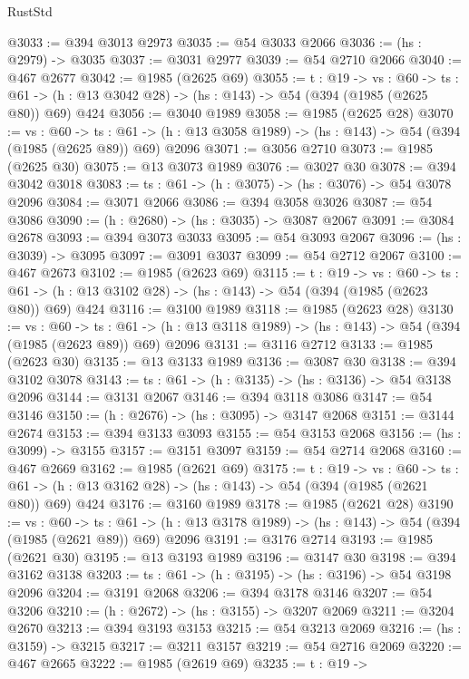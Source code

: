 \begin{lexlean}{RustStd}
\begin{coremodule}
{\begin{coremodule}
{{{{{{{{@3033 := @394 @3013 @2973
@3035 := @54 @3033 @2066
@3036 := (hs : @2979) -> @3035
@3037 := @3031 @2977
@3039 := @54 @2710 @2066
@3040 := @467 @2677
@3042 := @1985 (@2625 @69)
@3055 := {t : @19} ->
  {vs : @60} ->
  {ts : @61} -> (h : @13 @3042 @28) -> (hs : @143) -> @54 (@394 (@1985 (@2625 @80)) @69) @424
@3056 := @3040 @1989
@3058 := @1985 (@2625 @28)
@3070 := {vs : @60} ->
  {ts : @61} -> (h : @13 @3058 @1989) -> (hs : @143) -> @54 (@394 (@1985 (@2625 @89)) @69) @2096
@3071 := @3056 @2710
@3073 := @1985 (@2625 @30)
@3075 := @13 @3073 @1989
@3076 := @3027 @30
@3078 := @394 @3042 @3018
@3083 := {ts : @61} -> (h : @3075) -> (hs : @3076) -> @54 @3078 @2096
@3084 := @3071 @2066
@3086 := @394 @3058 @3026
@3087 := @54 @3086
@3090 := (h : @2680) -> (hs : @3035) -> @3087 @2067
@3091 := @3084 @2678
@3093 := @394 @3073 @3033
@3095 := @54 @3093 @2067
@3096 := (hs : @3039) -> @3095
@3097 := @3091 @3037
@3099 := @54 @2712 @2067
@3100 := @467 @2673
@3102 := @1985 (@2623 @69)
@3115 := {t : @19} ->
  {vs : @60} ->
  {ts : @61} -> (h : @13 @3102 @28) -> (hs : @143) -> @54 (@394 (@1985 (@2623 @80)) @69) @424
@3116 := @3100 @1989
@3118 := @1985 (@2623 @28)
@3130 := {vs : @60} ->
  {ts : @61} -> (h : @13 @3118 @1989) -> (hs : @143) -> @54 (@394 (@1985 (@2623 @89)) @69) @2096
@3131 := @3116 @2712
@3133 := @1985 (@2623 @30)
@3135 := @13 @3133 @1989
@3136 := @3087 @30
@3138 := @394 @3102 @3078
@3143 := {ts : @61} -> (h : @3135) -> (hs : @3136) -> @54 @3138 @2096
@3144 := @3131 @2067
@3146 := @394 @3118 @3086
@3147 := @54 @3146
@3150 := (h : @2676) -> (hs : @3095) -> @3147 @2068
@3151 := @3144 @2674
@3153 := @394 @3133 @3093
@3155 := @54 @3153 @2068
@3156 := (hs : @3099) -> @3155
@3157 := @3151 @3097
@3159 := @54 @2714 @2068
@3160 := @467 @2669
@3162 := @1985 (@2621 @69)
@3175 := {t : @19} ->
  {vs : @60} ->
  {ts : @61} -> (h : @13 @3162 @28) -> (hs : @143) -> @54 (@394 (@1985 (@2621 @80)) @69) @424
@3176 := @3160 @1989
@3178 := @1985 (@2621 @28)
@3190 := {vs : @60} ->
  {ts : @61} -> (h : @13 @3178 @1989) -> (hs : @143) -> @54 (@394 (@1985 (@2621 @89)) @69) @2096
@3191 := @3176 @2714
@3193 := @1985 (@2621 @30)
@3195 := @13 @3193 @1989
@3196 := @3147 @30
@3198 := @394 @3162 @3138
@3203 := {ts : @61} -> (h : @3195) -> (hs : @3196) -> @54 @3198 @2096
@3204 := @3191 @2068
@3206 := @394 @3178 @3146
@3207 := @54 @3206
@3210 := (h : @2672) -> (hs : @3155) -> @3207 @2069
@3211 := @3204 @2670
@3213 := @394 @3193 @3153
@3215 := @54 @3213 @2069
@3216 := (hs : @3159) -> @3215
@3217 := @3211 @3157
@3219 := @54 @2716 @2069
@3220 := @467 @2665
@3222 := @1985 (@2619 @69)
@3235 := {t : @19} ->
}}}}}}}}
\end{coremodule}}
\end{coremodule}
\end{lexlean}
